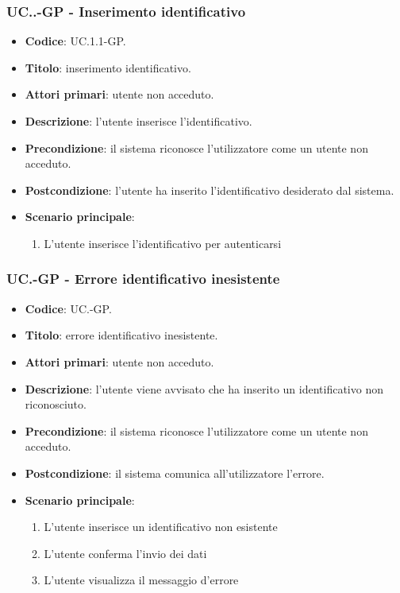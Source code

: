 		\subsubsection{UC\theuccount.\thesubuccount.\thesubsubuccount-GP - Inserimento identificativo}
			\begin{itemize}
				\item \textbf{Codice}: UC\theuccount.1.1-GP.
				\item \textbf{Titolo}: inserimento identificativo.
				\item \textbf{Attori primari}: utente non acceduto.
				\item \textbf{Descrizione}: l'utente inserisce l'identificativo.
				\item \textbf{Precondizione}: il sistema riconosce l'utilizzatore come un utente non acceduto.
				\item \textbf{Postcondizione}: l'utente ha inserito l'identificativo desiderato dal sistema.
				\item \textbf{Scenario principale}:
				\begin{enumerate}
					\item L'utente inserisce l'identificativo per autenticarsi
				\end{enumerate}
			\end{itemize}

	\subsubsection{UC\theuccount.\thesubuccount-GP - Errore identificativo inesistente}
		\begin{itemize}
			\item \textbf{Codice}: UC\theuccount.\thesubuccount-GP.
			\item \textbf{Titolo}: errore identificativo inesistente.
			\item \textbf{Attori primari}: utente non acceduto.
			\item \textbf{Descrizione}: l'utente viene avvisato che ha inserito un identificativo non riconosciuto.
			\item \textbf{Precondizione}: il sistema riconosce l'utilizzatore come un utente non acceduto.
			\item \textbf{Postcondizione}: il sistema comunica all'utilizzatore l'errore.
			\item \textbf{Scenario principale}:
			\begin{enumerate}
				\item L'utente inserisce un identificativo non esistente
				\item L'utente conferma l'invio dei dati
				\item L'utente visualizza il messaggio d'errore
			\end{enumerate}
		\end{itemize}
